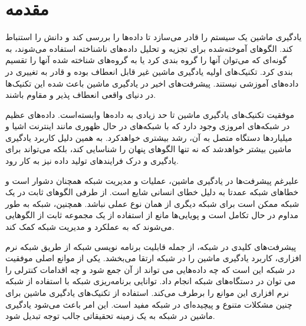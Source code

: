 \thispagestyle{empty}
\chapter{مقدمه}

یادگیری ماشین یک سیستم را قادر می‌سازد تا داده‌ها را بررسی کند و دانش را استنباط کند. الگوهای آموخته‌شده برای تجزیه و تحلیل داده‌های ناشناخته استفاده می‌شوند، به گونه‌ای که می‌توان آنها را گروه بندی کرد یا به گروه‌های شناخته شده آنها را تقسیم بندی کرد. تکنیک‌های اولیه یادگیری ماشین غیر قابل انعطاف بوده و قادر به تغییری در داده‌های آموزشی نیستند. پیشرفت‌های اخیر در یادگیری ماشین باعث شده این تکنیک‌ها در دنیای واقعی انعطاف پذیر و مقاوم باشند.


موفقیت تکنیک‌های یادگیری ماشین تا حد زیادی به داده‌ها وابسته‌است. داده‌های عظیم در شبکه‌های امروزی وجود دارد که با شبکه‌های در حال ظهوری مانند اینترنت اشیا و میلیاردها دستگاه متصل به آن، رشد بیشتری خواهدکرد. به همین دلیل کاربرد یادگیری ماشین بیشتر خواهدشد که نه تنها الگوهای پنهان را شناسایی کند، بلکه می‌تواند برای یادگیری و درک فرایندهای تولید داده نیز به کار رود.


علیرغم پیشرفت‌ها در یادگیری ماشین، عملیات و مدیریت شبکه همچنان دشوار است و خطاهای شبکه عمدتا به دلیل خطای انسانی شایع است. از طرفی الگوهای ثابت در یک شبکه ممکن است برای شبکه دیگری از همان نوع عملی نباشد. همچنین، شبکه به طور مداوم در حال تکامل است و پویایی‌ها مانع از استفاده از یک مجموعه ثابت از الگوهایی می‌شوند که به عملکرد و مدیریت شبکه کمک کند.


پیشرفت‌های کلیدی در شبکه، از جمله قابلیت برنامه نویسی شبکه از طریق شبکه نرم افزاری، کاربرد یادگیری ماشین را در شبکه ارتقا می‌بخشد. یکی از موانع اصلی موفقیت در شبکه‌ این است که چه داده‌هایی می تواند از آن جمع شود و چه اقدامات کنترلی را می توان در دستگاه‌های شبکه انجام داد. توانایی برنامه‌ریزی شبکه با استفاده از شبکه نرم افزاری این موانع را برطرف می‌کند. استفاده از تکنیک‌های یادگیری ماشین برای چنین مشکلات متنوع و پیچیده‌ای در شبکه مفید است. این امر باعث می‌شود یادگیری ماشین در شبکه به یک زمینه تحقیقاتی جالب توجه تبدیل شود.



\newpage



